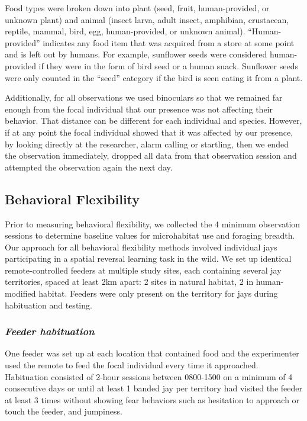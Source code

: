 \documentclass[
]{article}
\begin{document}
Food types were broken down into plant (seed, fruit, human-provided, or
unknown plant) and animal (insect larva, adult insect, amphibian,
crustacean, reptile, mammal, bird, egg, human-provided, or unknown
animal). ``Human-provided'' indicates any food item that was acquired
from a store at some point and is left out by humans. For example,
sunflower seeds were considered human-provided if they were in the form
of bird seed or a human snack. Sunflower seeds were only counted in the
``seed'' category if the bird is seen eating it from a plant.

Additionally, for all observations we used binoculars so that we
remained far enough from the focal individual that our presence was not
affecting their behavior. That distance can be different for each
individual and species. However, if at any point the focal individual
showed that it was affected by our presence, by looking directly at the
researcher, alarm calling or startling, then we ended the observation
immediately, dropped all data from that observation session and
attempted the observation again the next day.

\subsection{Behavioral Flexibility}\label{behavioral-flexibility}

Prior to measuring behavioral flexibility, we collected the 4 minimum
observation sessions to determine baseline values for microhabitat use
and foraging breadth. Our approach for all behavioral flexibility
methods involved individual jays participating in a spatial reversal
learning task in the wild. We set up identical remote-controlled feeders
at multiple study sites, each containing several jay territories, spaced
at least 2km apart: 2 sites in natural habitat, 2 in human-modified
habitat. Feeders were only present on the territory for jays during
habituation and testing.

\subsubsection{\texorpdfstring{\emph{Feeder
habituation}}{Feeder habituation}}\label{feeder-habituation}

One feeder was set up at each location that contained food and the
experimenter used the remote to feed the focal individual every time it
approached. Habituation consisted of 2-hour sessions between 0800-1500
on a minimum of 4 consecutive days or until at least 1 banded jay per
territory had visited the feeder at least 3 times without showing fear
behaviors such as hesitation to approach or touch the feeder, and
jumpiness.
\end{document}
